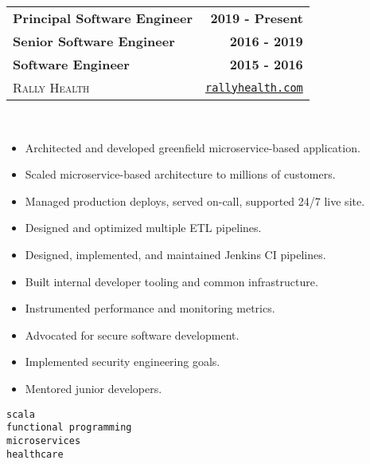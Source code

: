\documentclass[10pt,letterpaper]{article}
\newenvironment{details}
{\begin{itemize}}
{\end{itemize}}
\begin{document}
  \noindent\begin{tabularx}{\textwidth}{@{}X r@{}}
    \textbf{Principal Software Engineer} & \textbf{2019 - Present} \\
    \textbf{Senior Software Engineer} & \textbf{2016 - 2019} \\
    \textbf{Software Engineer} & \textbf{2015 - 2016} \\
    \textsc{Rally Health} & \texttt{\href{http://rallyhealth.com}{rallyhealth.com}}
  \end{tabularx}
  \hfill\\
  \noindent\begin{minipage}[t]{\dimexpr.7\textwidth-.7\columnsep}
    \raggedright
    \begin{details}
    \item Architected and developed greenfield microservice-based application.
    \item Scaled microservice-based architecture to millions of customers.
    \item Managed production deploys, served on-call, supported 24/7 live site.
    \item Designed and optimized multiple ETL pipelines.
    \item Designed, implemented, and maintained Jenkins CI pipelines.
    \item Built internal developer tooling and common infrastructure.
    \item Instrumented performance and monitoring metrics.
    \item Advocated for secure software development.
    \item Implemented security engineering goals.
    \item Mentored junior developers.
    \end{details}
  \end{minipage}%
  \begin{minipage}[t]{\dimexpr.32\textwidth-.32\columnsep}
    \raggedleft
    \texttt{scala} \\
    \texttt{functional programming} \\
    \texttt{microservices} \\
    \texttt{healthcare}
  \end{minipage}

  \hfill\\
\end{document}
